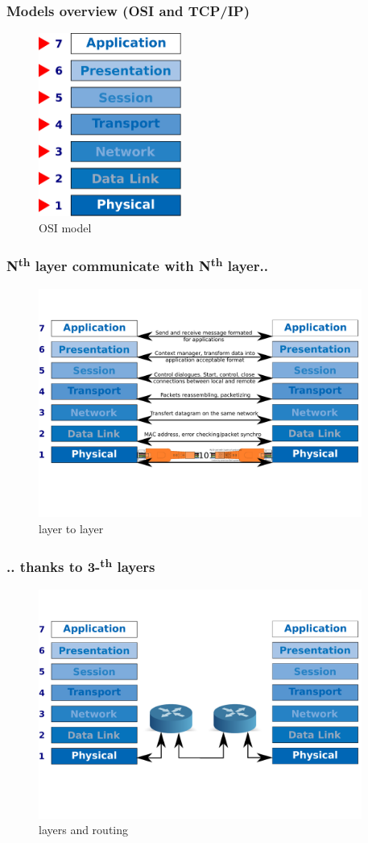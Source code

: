   \begin{frame}
    \frametitle{Models overview (OSI and TCP/IP)}
    \begin{figure}[t]
      \centering
      \includegraphics[height=6cm]{./imgs/osi_model.eps}
      \caption{OSI model}
      \label{fig:osi_mod}
    \end{figure}
  \end{frame}
  \begin{frame}
    \frametitle{N\textsuperscript{th} layer communicate with N\textsuperscript{th} layer..}
    \begin{figure}[t]
      \centering
      \includegraphics[height=7.5cm]{./imgs/layer2layer.pdf}
      \caption{layer to layer}
      \label{fig:layer2layer}
    \end{figure}
  \end{frame}
  \begin{frame}
    \frametitle{.. thanks to 3-\textsuperscript{th} layers}
    \begin{figure}[t]
      \centering
      \includegraphics[height=7.5cm]{./imgs/layers_routers.pdf}
      \caption{layers and routing}
      \label{fig:layers_routing}
    \end{figure}
  \end{frame}
